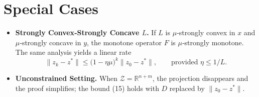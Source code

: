 \documentclass{article}
\newcommand{\R}{\mathbb{R}}
\begin{document}
\section*{Special Cases}
\begin{itemize}
\item \textbf{Strongly Convex‑Strongly Concave $L$.}  If $L$ is $\mu$‑strongly convex in $x$ and $\mu$‑strongly concave in $y$, the monotone operator $F$ is $\mu$‑strongly monotone.  The same analysis yields a linear rate
\[
\|z_{k}-z^{*}\|\le\bigl(1-\eta\mu\bigr)^{k}\|z_{0}-z^{*}\|,
\qquad\text{provided }\eta\le 1/L.
\]
\item \textbf{Unconstrained Setting.}  When $\mathcal Z=\R^{n+m}$, the projection disappears and the proof simplifies; the bound (15) holds with $D$ replaced by $\|z_{0}-z^{*}\|$.
\end{itemize}
\end{document}
